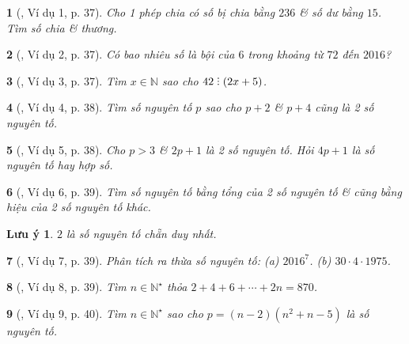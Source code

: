 \documentclass{article}
\newtheorem{baitoan}{}
\newtheorem{luuy}{Lưu ý}
\DeclareRobustCommand{\divby}{%
	\mathrel{\vbox{\baselineskip.65ex\lineskiplimit0pt\hbox{.}\hbox{.}\hbox{.}}}%
}
\begin{document}
\begin{baitoan}[\cite{Binh_boi_duong_Toan_6_tap_1}, Ví dụ 1, p. 37]
	Cho 1 phép chia có số bị chia bằng $236$ \& số dư bằng $15$. Tìm số chia \& thương.
\end{baitoan}

\begin{baitoan}[\cite{Binh_boi_duong_Toan_6_tap_1}, Ví dụ 2, p. 37]
	Có bao nhiêu số là bội của $6$ trong khoảng từ $72$ đến $2016$?
\end{baitoan}

\begin{baitoan}[\cite{Binh_boi_duong_Toan_6_tap_1}, Ví dụ 3, p. 37]
	Tìm $x\in\mathbb{N}$ sao cho $42\divby(2x + 5)$.
\end{baitoan}

\begin{baitoan}[\cite{Binh_boi_duong_Toan_6_tap_1}, Ví dụ 4, p. 38]
	Tìm số nguyên tố $p$ sao cho $p + 2$ \& $p + 4$ cũng là 2 số nguyên tố.
\end{baitoan}

\begin{baitoan}[\cite{Binh_boi_duong_Toan_6_tap_1}, Ví dụ 5, p. 38]
	Cho $p > 3$ \& $2p + 1$ là 2 số nguyên tố. Hỏi $4p + 1$ là số nguyên tố hay hợp số.
\end{baitoan}

\begin{baitoan}[\cite{Binh_boi_duong_Toan_6_tap_1}, Ví dụ 6, p. 39]
	Tìm số nguyên tố bằng tổng của 2 số nguyên tố \& cũng bằng hiệu của 2 số nguyên tố khác.
\end{baitoan}

\begin{luuy}
	$2$ là số nguyên tố chẵn duy nhất.
\end{luuy}

\begin{baitoan}[\cite{Binh_boi_duong_Toan_6_tap_1}, Ví dụ 7, p. 39]
	Phân tích ra thừa số nguyên tố: (a) $2016^7$. (b) $30\cdot4\cdot1975$.
\end{baitoan}

\begin{baitoan}[\cite{Binh_boi_duong_Toan_6_tap_1}, Ví dụ 8, p. 39]
	Tìm $n\in\mathbb{N}^\star$ thỏa $2 + 4 + 6 + \cdots + 2n = 870$.
\end{baitoan}

\begin{baitoan}[\cite{Binh_boi_duong_Toan_6_tap_1}, Ví dụ 9, p. 40]
	Tìm $n\in\mathbb{N}^\star$ sao cho $p = (n - 2)(n^2 + n - 5)$ là số nguyên tố.
\end{baitoan}
\end{document}

